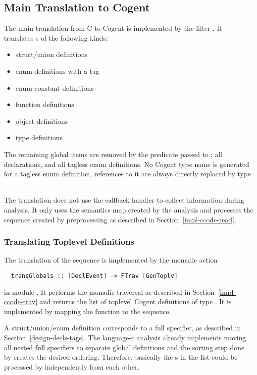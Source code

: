 \subsection{Main Translation to Cogent}
\label{impl-ccomps-main}

The main translation from C to Cogent is implemented by the filter . It translates s
of the following kinds:
\begin{itemize}
\item struct/union definitions
\item enum definitions with a tag
\item enum constant definitions
\item function definitions
\item object definitions
\item type definitions
\end{itemize}
The remaining global items are removed by the predicate passed to : all declarations, 
and all tagless enum definitions. No Cogent type name is generated for a tagless enum definition,
references to it are always directly replaced by type .

The translation does not use the callback handler to collect information during analysis. It only uses the semantics map
created by the analysis and processes the  sequence created by preprocessing as described in 
Section~\ref{impl-ccode-read}.

\subsubsection{Translating Toplevel Definitions}

The translation of the  sequence is implemented by the monadic action
\begin{verbatim}
  transGlobals :: [DeclEvent] -> FTrav [GenToplv]
\end{verbatim}
in module .
It performs the monadic traversal as described in Section~\ref{impl-ccode-trav} and returns the list of toplevel
Cogent definitions of type . It is implemented by mapping the function  to the 
 sequence.

A struct/union/enum definition corresponds to a full specifier, as described in Section~\ref{design-decls-tags}.
The language-c analysis already implements moving all nested full specifiers to separate global definitions and the
sorting step done by  creates the desired ordering. Therefore, basically the 
s in the list could be processed by  independently from each other.

